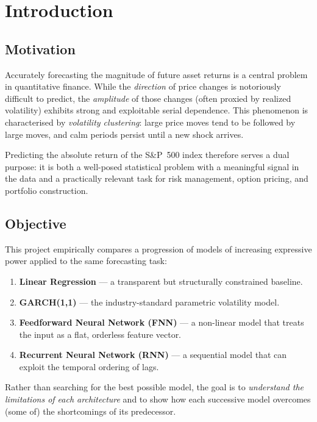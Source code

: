 \section{Introduction}
\label{sec:introduction}

\subsection{Motivation}

Accurately forecasting the magnitude of future asset returns is a central problem in
quantitative finance. While the \emph{direction} of price changes is notoriously
difficult to predict, the \emph{amplitude} of those changes (often proxied by realized
volatility) exhibits strong and exploitable serial dependence. This phenomenon is
characterised by \emph{volatility clustering}: large
price moves tend to be followed by large moves, and calm periods persist until a new
shock arrives.

Predicting the absolute return of the S\&P~500 index therefore serves a dual purpose: it
is both a well-posed statistical problem with a meaningful signal in the data and a
practically relevant task for risk management, option pricing, and portfolio construction.

\subsection{Objective}

This project empirically compares a progression of models of increasing expressive power
applied to the same forecasting task:

\begin{enumerate}
  \item \textbf{Linear Regression} --- a transparent but structurally constrained baseline.
  \item \textbf{GARCH(1,1)} --- the industry-standard parametric volatility model.
  \item \textbf{Feedforward Neural Network (FNN)} --- a non-linear model that treats the
        input as a flat, orderless feature vector.
  \item \textbf{Recurrent Neural Network (RNN)} --- a sequential model that can exploit
        the temporal ordering of lags.
\end{enumerate}

Rather than searching for the best possible model, the goal is to \emph{understand the
limitations of each architecture} and to show how each successive model overcomes
(some of) the shortcomings of its predecessor.

